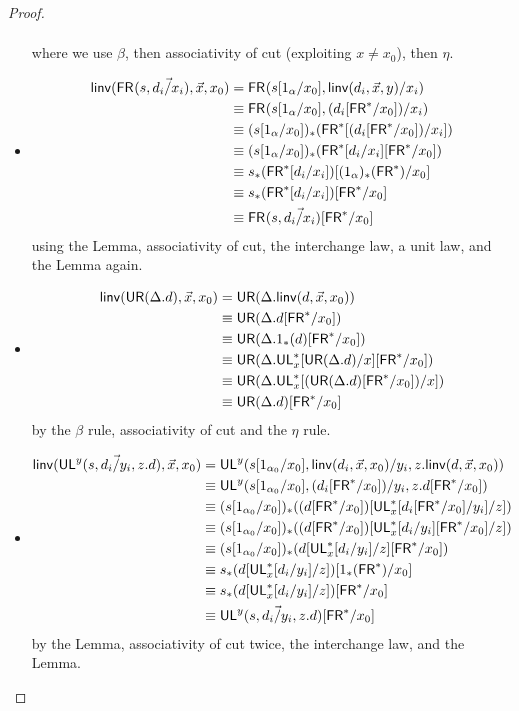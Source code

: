 \begin{proof}
\begin{itemize}
\begin{align*}
\end{align*}
where we use $\beta$, then associativity of cut (exploiting $x \neq x_0$), then $\eta$.
\item \begin{align*}
\mathsf{linv}(\mathsf{FR}_{}(s,\vec{d_i/x_i}),\vec{x},x_0) 
&= \mathsf{FR}_{}(s[1_\alpha/x_0],{{\mathsf{linv}(d_i,\vec{x},y)}/x_i}) \\
&\equiv \mathsf{FR}_{}(s[1_\alpha/x_0],(d_i[\mathsf{FR}^*/x_0])/x_i) \\
&\equiv (s[1_\alpha/x_0])_*(\mathsf{FR}^*[(d_i[\mathsf{FR}^*/x_0])/x_i]) \\
&\equiv (s[1_\alpha/x_0])_*(\mathsf{FR}^*[d_i/x_i][\mathsf{FR}^*/x_0]) \\
&\equiv s_*(\mathsf{FR}^*[d_i/x_i])[(1_\alpha)_*(\mathsf{FR}^*)/x_0] \\
&\equiv s_*(\mathsf{FR}^*[d_i/x_i])[\mathsf{FR}^*/x_0] \\
&\equiv \mathsf{FR}_{}(s,\vec{d_i/x_i})[\mathsf{FR}^*/x_0]
\end{align*}
using the Lemma, associativity of cut, the interchange law, a unit law, and the Lemma again.
\item \begin{align*}
\mathsf{linv}(\mathsf{UR}(\Delta.d),\vec{x},x_0) 
&= \mathsf{UR}(\Delta.\mathsf{linv}(d,\vec{x},x_0)) \\
&\equiv \mathsf{UR}(\Delta.d[\mathsf{FR}^*/x_0]) \\
&\equiv \mathsf{UR}(\Delta.1_*(d)[\mathsf{FR}^*/x_0]) \\
&\equiv \mathsf{UR}(\Delta.\mathsf{UL}^*_{x}[\mathsf{UR}(\Delta.d)/x][\mathsf{FR}^*/x_0]) \\
&\equiv \mathsf{UR}(\Delta.\mathsf{UL}^*_{x}[(\mathsf{UR}(\Delta.d)[\mathsf{FR}^*/x_0])/x])\\
&\equiv \mathsf{UR}(\Delta.d)[\mathsf{FR}^*/x_0]
\end{align*}
by the $\beta$ rule, associativity of cut and the $\eta$ rule.
\item \begin{align*}
\mathsf{linv}(\mathsf{UL}^{y}_{}(s,\vec{d_i/y_i},z.d),\vec{x},x_0) 
&= \mathsf{UL}^{y}_{}(s[1_{\alpha_0}/x_0],\mathsf{linv}(d_i,\vec{x},x_0)/y_i,z.\mathsf{linv}(d,\vec{x},x_0)) \\
&\equiv \mathsf{UL}^{y}_{}(s[1_{\alpha_0}/x_0],(d_i[\mathsf{FR}^*/x_0])/y_i,z.d[\mathsf{FR}^*/x_0]) \\
&\equiv (s[1_{\alpha_0}/x_0])_*((d[\mathsf{FR}^*/x_0])[\mathsf{UL}^*_{x}[d_i[\mathsf{FR}^*/x_0]/y_i]/z]) \\
&\equiv (s[1_{\alpha_0}/x_0])_*((d[\mathsf{FR}^*/x_0])[\mathsf{UL}^*_{x}[d_i/y_i][\mathsf{FR}^*/x_0]/z]) \\
&\equiv (s[1_{\alpha_0}/x_0])_*(d[\mathsf{UL}^*_{x}[d_i/y_i]/z][\mathsf{FR}^*/x_0]) \\
&\equiv s_*(d[\mathsf{UL}^*_{x}[d_i/y_i]/z])[1_*(\mathsf{FR}^*)/x_0] \\
&\equiv s_*(d[\mathsf{UL}^*_{x}[d_i/y_i]/z])[\mathsf{FR}^*/x_0] \\
&\equiv \mathsf{UL}^{y}_{}(s,\vec{d_i/y_i},z.d)[\mathsf{FR}^*/x_0]
\end{align*}
by the Lemma, associativity of cut twice, the interchange law, and the Lemma.
\end{itemize}

\end{proof}

